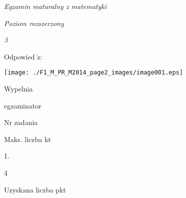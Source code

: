 \documentclass[a4paper,12pt]{article}
\begin{document}
{\it Egzamin maturalny z matematyki}

{\it Poziom rozszerzony}

{\it 3}

Odpowied $\acute{\mathrm{z}}$:
\begin{center}
\texttt{[image: ./F1\_M\_PR\_M2014\_page2\_images/image001.eps]}
\end{center}
Wypelnia

egzaminator

Nr zadania

Maks. liczba kt

1.

4

Uzyskana liczba pkt
\end{document}
